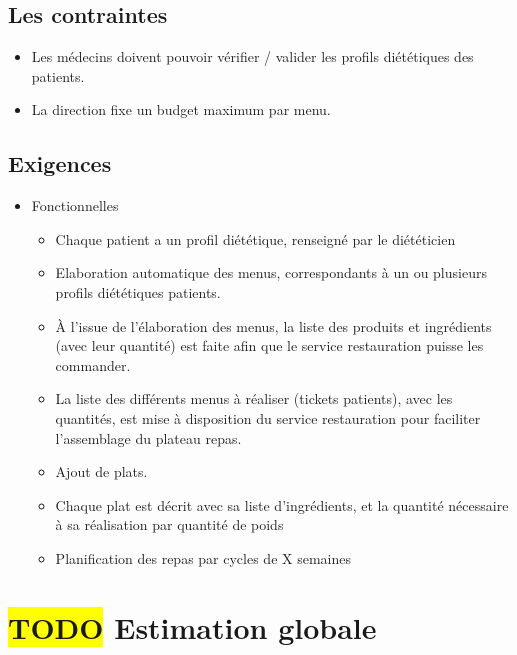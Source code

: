 \subsection{Les contraintes}
\begin{itemize}
\item Les médecins doivent pouvoir vérifier / valider les profils diététiques des patients.
\item La direction fixe un budget maximum par menu.
\end{itemize}

\subsection{Exigences}
\begin{itemize}
\item Fonctionnelles
  \begin{itemize}
  \item Chaque patient a un profil diététique, renseigné par le diététicien
  \item Elaboration automatique des menus, correspondants à un ou plusieurs profils diététiques patients.
  \item À l'issue de l'élaboration des menus, la liste des produits et
    ingrédients (avec leur quantité) est faite afin que le service
    restauration puisse les commander.
  \item La liste des différents menus à réaliser (tickets patients), avec les quantités, est mise à disposition du service restauration pour faciliter l'assemblage du plateau repas.
  \item Ajout de plats.
  \item Chaque plat est décrit avec sa liste d'ingrédients, et la quantité nécessaire à sa réalisation par quantité de poids
  \item Planification des repas par cycles de X semaines
  \end{itemize}
\end{itemize}

\section{\colorbox{yellow}{TODO} Estimation globale}
